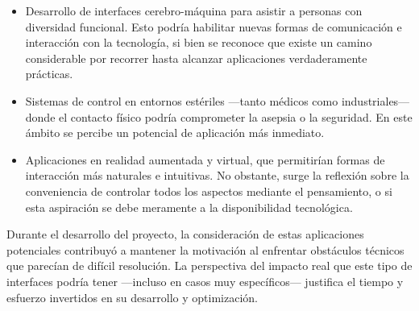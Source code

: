     \begin{itemize}
        \item Desarrollo de interfaces cerebro-máquina para asistir a personas con diversidad funcional. Esto podría habilitar nuevas formas de comunicación e interacción con la tecnología, si bien se reconoce que existe un camino considerable por recorrer hasta alcanzar aplicaciones verdaderamente prácticas.
        \item Sistemas de control en entornos estériles —tanto médicos como industriales— donde el contacto físico podría comprometer la asepsia o la seguridad. En este ámbito se percibe un potencial de aplicación más inmediato.
        \item Aplicaciones en realidad aumentada y virtual, que permitirían formas de interacción más naturales e intuitivas. No obstante, surge la reflexión sobre la conveniencia de controlar todos los aspectos mediante el pensamiento, o si esta aspiración se debe meramente a la disponibilidad tecnológica.
    \end{itemize}

Durante el desarrollo del proyecto, la consideración de estas aplicaciones potenciales contribuyó a mantener la motivación al enfrentar obstáculos técnicos que parecían de difícil resolución. La perspectiva del impacto real que este tipo de interfaces podría tener —incluso en casos muy específicos— justifica el tiempo y esfuerzo invertidos en su desarrollo y optimización.
